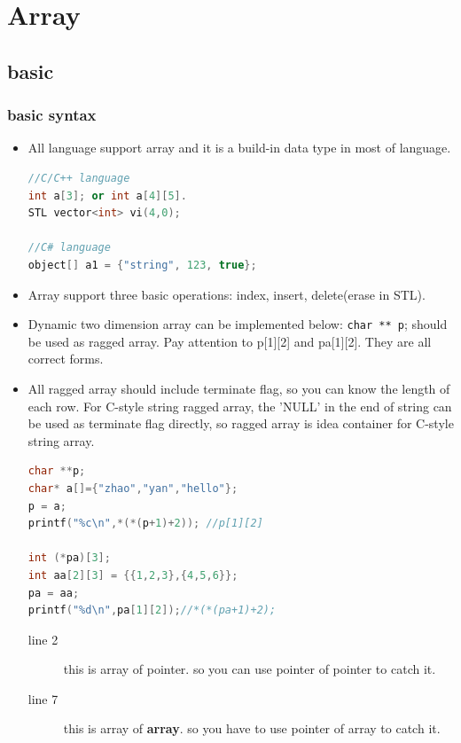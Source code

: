 \documentclass[a4paper,11pt,twoside]{book}
\begin{document}
\section{Array}
\subsection{basic}
\subsubsection{basic syntax}
\begin{itemize}
\item All language support array and it is a build-in data type in most of language.  
\begin{lstlisting}[frame=single, language=c++]
//C/C++ language
int a[3]; or int a[4][5].  
STL vector<int> vi(4,0);
  
//C# language 
object[] a1 = {"string", 123, true};
\end{lstlisting}

\item Array support three basic operations: index, insert, delete(erase in STL).  

\item Dynamic two dimension array can be implemented below:  \texttt{char ** p}; should be used as ragged array. Pay attention to p[1][2] and pa[1][2]. They are all correct forms.

\item All ragged array should include terminate flag, so you can know the length of each row.  For C-style string ragged array, the 'NULL' in the end of string can be used as terminate flag directly, so ragged array is idea container for C-style string array. 

\begin{lstlisting}[frame=single, language=c++]
char **p;
char* a[]={"zhao","yan","hello"};
p = a;
printf("%c\n",*(*(p+1)+2)); //p[1][2]

int (*pa)[3];
int aa[2][3] = {{1,2,3},{4,5,6}};
pa = aa;
printf("%d\n",pa[1][2]);//*(*(pa+1)+2);
\end{lstlisting} 
\begin{description}
	\item[line 2] this is array of pointer. so you can use pointer of pointer to catch it.
	\item[line 7] this is array of \textbf{array}. so you have to use pointer of array to catch it.
\end{description}

\end{itemize}
\end{document}
